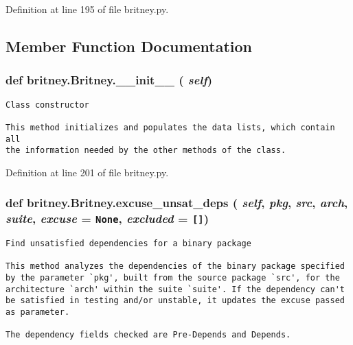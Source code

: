 Definition at line 195 of file britney.py.

\subsection{Member Function Documentation}
\subsubsection{\setlength{\rightskip}{0pt plus 5cm}def britney.Britney.\_\-\_\-init\_\-\_\- ( {\em self})}\label{classbritney_1_1Britney_5846d81eace24f479292c47e30fd1851}




\footnotesize\begin{verbatim}Class constructor

This method initializes and populates the data lists, which contain all
the information needed by the other methods of the class.
\end{verbatim}
\normalsize
 

Definition at line 201 of file britney.py.
\subsubsection{\setlength{\rightskip}{0pt plus 5cm}def britney.Britney.excuse\_\-unsat\_\-deps ( {\em self},  {\em pkg},  {\em src},  {\em arch},  {\em suite},  {\em excuse} = {\tt None},  {\em excluded} = {\tt []})}\label{classbritney_1_1Britney_f51c60a69f3a9dc2bc5afdb2ffaf3990}




\footnotesize\begin{verbatim}Find unsatisfied dependencies for a binary package

This method analyzes the dependencies of the binary package specified
by the parameter `pkg', built from the source package `src', for the
architecture `arch' within the suite `suite'. If the dependency can't
be satisfied in testing and/or unstable, it updates the excuse passed
as parameter.

The dependency fields checked are Pre-Depends and Depends.
\end{verbatim}
\normalsize
 

